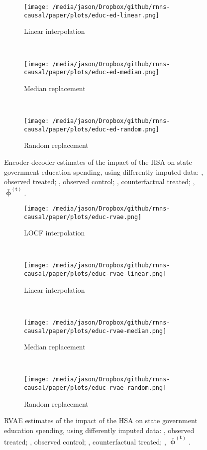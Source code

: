\begin{figure*}[htbp]
	\centering
	\begin{subfigure}[t]{0.43\textwidth}
		\centering
		\texttt{[image: /media/jason/Dropbox/github/rnns-causal/paper/plots/educ-ed-linear.png]}
		\caption{Linear interpolation} 
	\end{subfigure}
	~ 
	\begin{subfigure}[t]{0.43\textwidth}
		\centering
		\texttt{[image: /media/jason/Dropbox/github/rnns-causal/paper/plots/educ-ed-median.png]}
		\caption{Median replacement}
	\end{subfigure}
	~ 
	\begin{subfigure}[t]{0.43\textwidth}
	\centering
	\texttt{[image: /media/jason/Dropbox/github/rnns-causal/paper/plots/educ-ed-random.png]}
	\caption{Random replacement}
	\end{subfigure}
	\caption{Encoder-decoder estimates of the impact of the HSA on state government education spending, using differently imputed data:		{\color{Darjeeling15}{\sampleline{}}}, observed treated;
	{}, observed control;
	{}, counterfactual treated;
	{}, $\boldsymbol{\bar{\upphi}^{(t)}}$.\label{educ-ed-imp}}
\end{figure*}

\begin{figure*}[htbp]
	\centering
		\begin{subfigure}[t]{0.43\textwidth}
		\centering
		\texttt{[image: /media/jason/Dropbox/github/rnns-causal/paper/plots/educ-rvae.png]}
		\caption{LOCF interpolation} 
	\end{subfigure}
	~ 
	\begin{subfigure}[t]{0.43\textwidth}
		\centering
		\texttt{[image: /media/jason/Dropbox/github/rnns-causal/paper/plots/educ-rvae-linear.png]}
		\caption{Linear interpolation} 
	\end{subfigure}
	~ 
	\begin{subfigure}[t]{0.43\textwidth}
		\centering
		\texttt{[image: /media/jason/Dropbox/github/rnns-causal/paper/plots/educ-rvae-median.png]}
		\caption{Median replacement}
	\end{subfigure}
	~ 
	\begin{subfigure}[t]{0.43\textwidth}
		\centering
		\texttt{[image: /media/jason/Dropbox/github/rnns-causal/paper/plots/educ-rvae-random.png]}
		\caption{Random replacement}
	\end{subfigure}
	\caption{RVAE estimates of the impact of the HSA on state government education spending, using differently imputed data:		{\color{Darjeeling15}{\sampleline{}}}, observed treated;
		{}, observed control;
		{}, counterfactual treated;
		{}, $\boldsymbol{\bar{\upphi}^{(t)}}$.\label{educ-rvae-imp}}
\end{figure*}